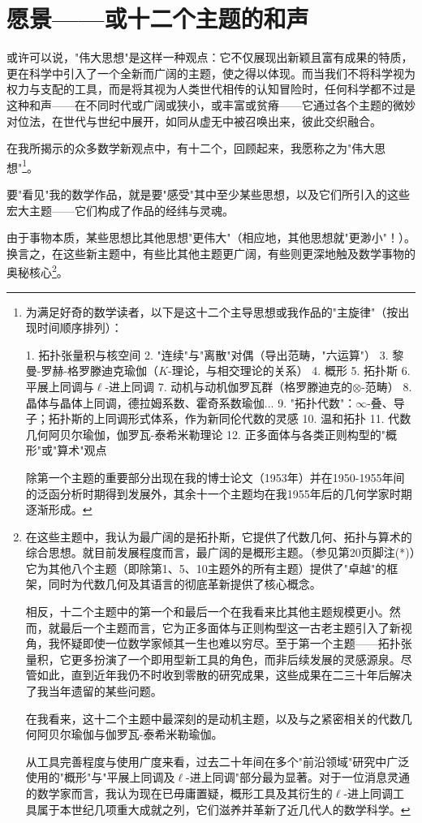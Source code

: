 \section{愿景——或十二个主题的和声}

或许可以说，"伟大思想"是这样一种观点：它不仅展现出新颖且富有成果的特质，更在科学中引入了一个全新而广阔的主题，使之得以体现。而当我们不将科学视为权力与支配的工具，而是将其视为人类世代相传的认知冒险时，任何科学都不过是这种和声——在不同时代或广阔或狭小，或丰富或贫瘠——它通过各个主题的微妙对位法，在世代与世纪中展开，如同从虚无中被召唤出来，彼此交织融合。

在我所揭示的众多数学新观点中，有十二个，回顾起来，我愿称之为"伟大思想"\footnote{为满足好奇的数学读者，以下是这十二个主导思想或我作品的"主旋律"（按出现时间顺序排列）：

1. 拓扑张量积与核空间
2. "连续"与"离散"对偶（导出范畴，"六运算"）
3. 黎曼-罗赫-格罗滕迪克瑜伽（$K$-理论，与相交理论的关系）
4. 概形
5. 拓扑斯
6. 平展上同调与$\ell$-进上同调
7. 动机与动机伽罗瓦群（格罗滕迪克的$\otimes$-范畴）
8. 晶体与晶体上同调，德拉姆系数、霍奇系数瑜伽...
9. "拓扑代数"：$\infty$-叠、导子；拓扑斯的上同调形式体系，作为新同伦代数的灵感
10. 温和拓扑
11. 代数几何阿贝尔瑜伽，伽罗瓦-泰希米勒理论
12. 正多面体与各类正则构型的"概形"或"算术"观点

除第一个主题的重要部分出现在我的博士论文（1953年）并在1950-1955年间的泛函分析时期得到发展外，其余十一个主题均在我1955年后的几何学家时期逐渐形成。}。

要"看见"我的数学作品，就是要"感受"其中至少某些思想，以及它们所引入的这些宏大主题——它们构成了作品的经纬与灵魂。

由于事物本质，某些思想比其他思想"更伟大"（相应地，其他思想就"更渺小"！）。换言之，在这些新主题中，有些比其他主题更广阔，有些则更深地触及数学事物的奥秘核心\footnote{在这些主题中，我认为最广阔的是拓扑斯，它提供了代数几何、拓扑与算术的综合思想。就目前发展程度而言，最广阔的是概形主题。（参见第20页脚注(*)）它为其他八个主题（即除第1、5、10主题外的所有主题）提供了"卓越"的框架，同时为代数几何及其语言的彻底革新提供了核心概念。

相反，十二个主题中的第一个和最后一个在我看来比其他主题规模更小。然而，就最后一个主题而言，它为正多面体与正则构型这一古老主题引入了新视角，我怀疑即使一位数学家倾其一生也难以穷尽。至于第一个主题——拓扑张量积，它更多扮演了一个即用型新工具的角色，而非后续发展的灵感源泉。尽管如此，直到近年我仍不时收到零散的研究成果，这些成果在二三十年后解决了我当年遗留的某些问题。

在我看来，这十二个主题中最深刻的是动机主题，以及与之紧密相关的代数几何阿贝尔瑜伽与伽罗瓦-泰希米勒瑜伽。

从工具完善程度与使用广度来看，过去二十年间在多个"前沿领域"研究中广泛使用的"概形"与"平展上同调及$\ell$-进上同调"部分最为显著。对于一位消息灵通的数学家而言，我认为现在已毋庸置疑，概形工具及其衍生的$\ell$-进上同调工具属于本世纪几项重大成就之列，它们滋养并革新了近几代人的数学科学。}。

